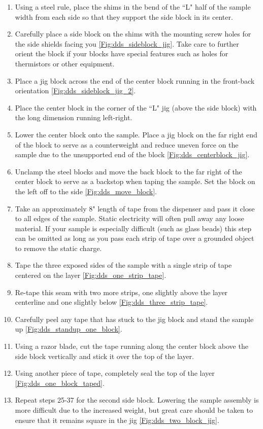 \begin{enumerate}
\item Using a steel rule, place the shims in the bend of the ``L" half of the sample width from each side so that they support the side block in its center.
\item Carefully place a side block on the shims with the mounting screw holes for the side shields facing you \ref{Fig:dds_sideblock_jig}. Take care to further orient the block if your blocks have special features such as holes for thermistors or other equipment.
\item Place a jig block across the end of the center block running in the front-back orientation \ref{Fig:dds_sideblock_jig_2}.
\item Place the center block in the corner of the ``L" jig (above the side block) with the long dimension running left-right.
\item Lower the center block onto the sample. Place a jig block on the far right end of the block to serve as a counterweight and reduce uneven force on the sample due to the unsupported end of the block \ref{Fig:dds_centerblock_jig}.
\item Unclamp the steel blocks and move the back block to the far right of the center block to serve as a backstop when taping the sample. Set the block on the left off to the side \ref{Fig:dds_move_block}.
\item Take an approximately 8" length of tape from the dispenser and pass it close to all edges of the sample. Static electricity will often pull away any loose material. If your sample is especially difficult (such as glass beads) this step can be omitted as long as you pass each strip of tape over a grounded object to remove the static charge.
\item Tape the three exposed sides of the sample with a single strip of tape centered on the layer \ref{Fig:dds_one_strip_tape}.
\item Re-tape this seam with two more strips, one slightly above the layer centerline and one slightly below \ref{Fig:dds_three_strip_tape}.
\item Carefully peel any tape that has stuck to the jig block and stand the sample up \ref{Fig:dds_standup_one_block}.
\item Using a razor blade, cut the tape running along the center block above the side block vertically and stick it over the top of the layer.
\item Using another piece of tape, completely seal the top of the layer \ref{Fig:dds_one_block_taped}.
\item Repeat steps 25-37 for the second side block. Lowering the sample assembly is more difficult due to the increased weight, but great care should be taken to ensure that it remains square in the jig \ref{Fig:dds_two_block_jig}.

\end{enumerate}
